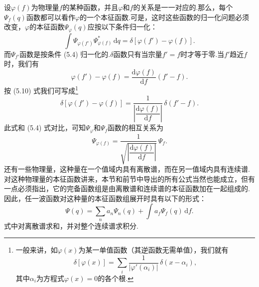 设$\varphi(f)$为物理量$f$的某种函数，并且$\varphi$和$f$的关系是一一对应的.那么，每个$\varPsi_f(q)$函数都可以看作$\varphi$的一个本征函数.可是，这时这些函数的归一化问题必须改变，$\varphi$的本征函数$\varPsi_{\varphi}(q)$应按以下条件归一化：
\begin{equation*}
  \int\varPsi_{\varphi(f')}\varPsi_{\varphi(f)}^{*}\,\mathrm{d}q
  =\delta[\varphi(f')-\varphi(f)].
\end{equation*}
而$\varPsi_{f'}$函数是按条件 (5.4) 归一化的.$\delta$函数只有当宗量$f'=f$时才等于零.当$f'$趋近$f$时，我们有
\begin{equation*}
  \varphi(f')-\varphi(f)=\frac{\mathrm{d}\varphi(f)}{\mathrm{d}f}(f'-f).
\end{equation*}
按 (5.10) 式我们可写成\footnote{一般来讲，如$\varphi(x)$为某一单值函数（其逆函数无需单值），我们就有
\begin{equation*}
  \delta[\varphi(x)]=\sum_i\frac{1}{|\varphi'(\alpha_i)|}\,\delta(x-\alpha_i),
\end{equation*}
其中$\alpha_i$为方程式$\varphi(x)=0$的各个根.}
\begin{equation}
  \delta[\varphi(f')-\varphi(f)]
  =\frac{1}{\left|\dfrac{\mathrm{d}\varphi(f)}{\mathrm{d}f}\right|}\,
  \delta(f'-f).
\end{equation}
此式和 (5.4) 式对比，可知$\varPsi_{\varphi}$和$\varPsi_f$函数的相互关系为
\begin{equation}
  \varPsi_{\varphi(f)}
  =\frac{1}{\sqrt{\left|\dfrac{\mathrm{d}\varphi(f)}{\mathrm{d}f}\right|}}\,
  \varPsi_f.
\end{equation}
还有一些物理量，这种量在一个值域内具有离散谱，而在另一值域内具有连续谱.对这种物理量的本征函数讲来，本节和前节中导出的所有公式当然也能成立，但有一点必须指出，它的完备函数组是由离散谱和连续谱的本征函数加在一起组成的.因此，任一波函数对这种量的本征函数组展开时具有以下的形式：
\begin{equation}
  \varPsi(q)=\sum_n a_n\varPsi_n(q)+\int a_f\varPsi_f(q)\,\mathrm{d}f.
\end{equation}
式中对离散谱求和，并对整个连续谱求积分.

